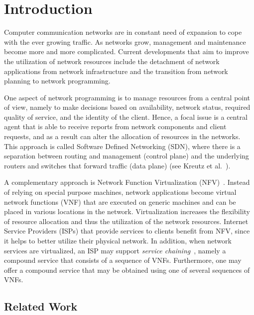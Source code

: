 \documentclass[11pt]{article}
\begin{document}

\section{Introduction}


Computer communication networks are in constant need of expansion to
cope with the ever growing traffic.  As networks grow, management and
maintenance become more and more complicated.
%
Current developments that aim to improve the utilization of network
resources include the detachment of network applications from network
infrastructure and the transition from network planning to network
programming.

One aspect of network programming is to manage resources from a
central point of view, namely to make decisions based on availability,
network status, required quality of service, and the identity of the
client.  Hence, a focal issue is a central agent that is able to
receive reports from network components and client requests, and as a
result can alter the allocation of resources in the networks.  This
approach is called Software Defined Networking (SDN), where there is a
separation between routing and management (control plane) and the
underlying routers and switches that forward traffic (data plane) (see
Kreutz et al.~\cite{KRVRAU15}).

A complementary approach is Network Function Virtualization
(NFV)~\cite{NFV12}.  Instead of relying on special purpose machines,
network applications become virtual network functions (VNF) that are
executed on generic machines and can be placed in various locations in
the network.  Virtualization increases the flexibility of resource
allocation and thus the utilization of the network resources.
%
Internet Service Providers (ISPs) that provide services to clients
benefit from NFV, since it helps to better utilize their physical
network.  In addition, when network services are virtualized, an ISP
may support \emph{service chaining}~\cite{ServiceChaining15}, namely a
compound service that consists of a sequence of VNFs.  Furthermore,
one may offer a compound service that may be obtained using one of
several sequences of VNFs.


\subsection{Related Work}
\end{document}
